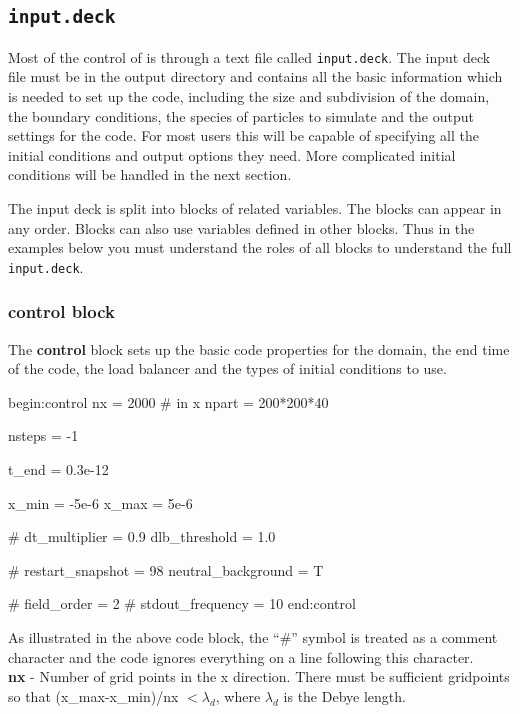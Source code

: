 \documentclass[12pt,a4paper]{article}
\newcommand{\emphtext}{\color{warwickdark} \fontfamily{phv}\selectfont\large\bf}
\newcommand{\code}[1]{{\texttt{#1}}}
\newcommand{\inlineemph}[1]{{\color{warwicklight} \bf{#1}}}
\newcommand{\cemph}[1]{{\inlineemph{#1}}}
\newcommand{\EPOCH}{{\color{warwickdark}\fontfamily{phv}\selectfont{EPOCH}}}
\newenvironment{lboxverbatim}[1]{
\setlength{\FrameSep}{0pt}
\def\FrameCommand{\fboxsep=0pt \colorbox{shadecolor}}
\MakeFramed{\FrameRestore}
\vspace{-13.5pt}
\fvset{label=#1}
\boxverb
}{
\endboxverb
\vspace{-13.5pt}
\endMakeFramed
}
\begin{document}
\subsection{\code{input.deck}}
Most of the control of {\EPOCH} is through a text file called \code{input.deck}.
The input deck file must be in the output directory and contains all the basic
information which is needed to set up the code, including the size and
subdivision of the domain, the boundary conditions, the species of particles to
simulate and the output settings for the code. For most users this will be
capable of specifying all the initial conditions and output options they need.
More complicated initial conditions will be handled in the next section.

The input deck is split into blocks of related variables. The blocks can appear
in any order. Blocks can also use variables defined in other blocks. Thus in
the examples below you must understand the roles of all blocks to understand
the full \code{input.deck}.

\subsubsection{\cemph{control} block}
The \cemph{control} block sets up the basic code properties for the
domain, the end time of the code, the load balancer and the types of initial
conditions to use.

\begin{lboxverbatim}{control block}
begin:control
   nx = 2000 # in x
   npart = 200*200*40

   nsteps = -1

   t_end = 0.3e-12

   x_min = -5e-6
   x_max = 5e-6

   # dt_multiplier = 0.9
   dlb_threshold = 1.0

   # restart_snapshot = 98
   neutral_background = T

   # field_order = 2
   # stdout_frequency = 10
end:control
\end{lboxverbatim}

As illustrated in the above code block, the ``\#'' symbol is treated as a
comment character and the code ignores everything on a line following this
character.\\

{\emphtext nx} - Number of grid points in the x direction. There must be
sufficient gridpoints so that (x\_max-x\_min)/nx $< \lambda_d$, where
$\lambda_d$ is the Debye length.\\
\end{document}

